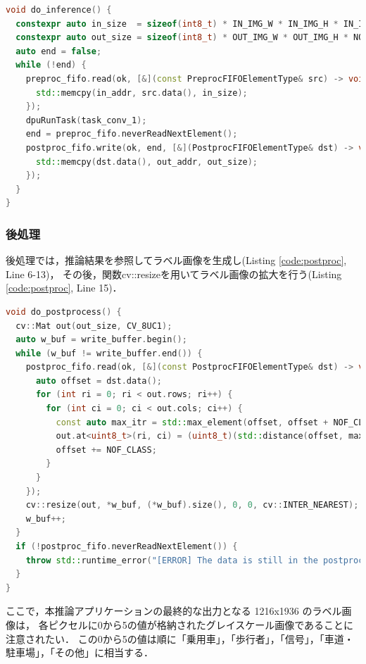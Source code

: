 \setcounter{lstnumber}{1}
\begin{lstlisting}[language=c++,firstnumber=last,caption=do\_inference(),label=code:inference]
void do_inference() {
  constexpr auto in_size  = sizeof(int8_t) * IN_IMG_W * IN_IMG_H * IN_IMG_C;
  constexpr auto out_size = sizeof(int8_t) * OUT_IMG_W * OUT_IMG_H * NOF_CLASS;
  auto end = false;
  while (!end) {
    preproc_fifo.read(ok, [&](const PreprocFIFOElementType& src) -> void {
      std::memcpy(in_addr, src.data(), in_size);
    });
    dpuRunTask(task_conv_1);
    end = preproc_fifo.neverReadNextElement();
    postproc_fifo.write(ok, end, [&](PostprocFIFOElementType& dst) -> void {
      std::memcpy(dst.data(), out_addr, out_size);
    });
  }
}
\end{lstlisting}

\subsubsection{後処理}
後処理では，推論結果を参照してラベル画像を生成し(Listing \ref{code:postproc}, Line 6-13)，
その後，関数cv::resizeを用いてラベル画像の拡大を行う(Listing \ref{code:postproc}, Line 15)．

\setcounter{lstnumber}{1}
\begin{lstlisting}[language=c++,firstnumber=last,caption=do\_postprocess(),label=code:postproc]
void do_postprocess() {
  cv::Mat out(out_size, CV_8UC1);
  auto w_buf = write_buffer.begin();
  while (w_buf != write_buffer.end()) {
    postproc_fifo.read(ok, [&](const PostprocFIFOElementType& dst) -> void {
      auto offset = dst.data();
      for (int ri = 0; ri < out.rows; ri++) {
        for (int ci = 0; ci < out.cols; ci++) {
          const auto max_itr = std::max_element(offset, offset + NOF_CLASS);
          out.at<uint8_t>(ri, ci) = (uint8_t)(std::distance(offset, max_itr));
          offset += NOF_CLASS;
        }
      }
    });
    cv::resize(out, *w_buf, (*w_buf).size(), 0, 0, cv::INTER_NEAREST);
    w_buf++;
  }
  if (!postproc_fifo.neverReadNextElement()) {
    throw std::runtime_error("[ERROR] The data is still in the postproc FIFO.");
  }
}
\end{lstlisting}

ここで，本推論アプリケーションの最終的な出力となる 1216x1936 のラベル画像は，
各ピクセルに0から5の値が格納されたグレイスケール画像であることに注意されたい．
この0から5の値は順に「乗用車」，「歩行者」，「信号」，「車道・駐車場」，「その他」に相当する．
